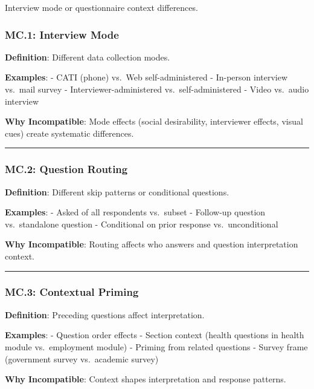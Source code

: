 \documentclass[
  letterpaper,
]{report}
\begin{document}
Interview mode or questionnaire context differences.

\subsubsection{MC.1: Interview Mode}\label{mc.1-interview-mode}

\textbf{Definition}: Different data collection modes.

\textbf{Examples}: - CATI (phone) vs.~Web self-administered - In-person
interview vs.~mail survey - Interviewer-administered
vs.~self-administered - Video vs.~audio interview

\textbf{Why Incompatible}: Mode effects (social desirability,
interviewer effects, visual cues) create systematic differences.

\begin{center}\rule{0.5\linewidth}{0.5pt}\end{center}

\subsubsection{MC.2: Question Routing}\label{mc.2-question-routing}

\textbf{Definition}: Different skip patterns or conditional questions.

\textbf{Examples}: - Asked of all respondents vs.~subset - Follow-up
question vs.~standalone question - Conditional on prior response
vs.~unconditional

\textbf{Why Incompatible}: Routing affects who answers and question
interpretation context.

\begin{center}\rule{0.5\linewidth}{0.5pt}\end{center}

\subsubsection{MC.3: Contextual Priming}\label{mc.3-contextual-priming}

\textbf{Definition}: Preceding questions affect interpretation.

\textbf{Examples}: - Question order effects - Section context (health
questions in health module vs.~employment module) - Priming from related
questions - Survey frame (government survey vs.~academic survey)

\textbf{Why Incompatible}: Context shapes interpretation and response
patterns.
\end{document}
